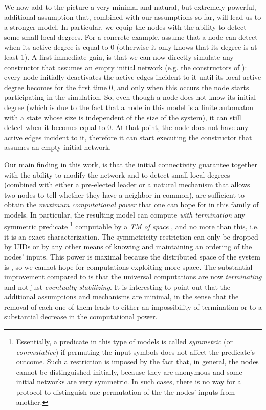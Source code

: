 \documentclass[preprint]{elsarticle}
\begin{document}
We now add to the picture a very minimal and natural, but extremely powerful, additional assumption that, combined with our assumptions so far, will lead us to a stronger model. In particular, we equip the nodes with the ability to detect some small local degrees. For a concrete example, assume that a node can detect when its active degree is equal to 0 (otherwise it only knows that its degree is at least 1). A first immediate gain, is that we can now directly simulate any constructor that assumes an empty initial network (e.g. the constructors of \cite{MS14}): every node initially deactivates the active edges incident to it until its local active degree becomes for the first time 0, and only when this occurs the node starts participating in the simulation. So, even though a node does not know its initial degree (which is due to the fact that a node in this model is a finite automaton with a state whose size is independent of the size of the system), it can still detect when it becomes equal to 0. At that point, the node does not have any active edges incident to it, therefore it can start executing the constructor that assumes an empty initial network.

Our main finding in this work, is that the initial connectivity guarantee together with the ability to modify the network and to detect small local degrees (combined with either a pre-elected leader or a natural mechanism that allows two nodes to tell whether they have a neighbor in common), are sufficient to obtain the \emph{maximum computational power} that one can hope for in this family of models. In particular, the resulting model can compute \emph{with termination} any symmetric predicate \footnote{Essentially, a predicate in this type of models is called \emph{symmetric} (or \emph{commutative}) if permuting the input symbols does not affect the predicate's outcome. Such a restriction is imposed by the fact that, in general, the nodes cannot be distinguished initially, because they are anonymous and some initial networks are very symmetric. In such cases, there is no way for a protocol to distinguish one permutation of the the nodes' inputs from another.} computable by a \emph{TM of space }, and no more than this, i.e. it is an exact characterization. The symmetricity restriction can only be dropped by UIDs or by any other means of knowing and maintaining an ordering of the nodes' inputs. This power is maximal because the distributed space of the system is , so we cannot hope for computations exploiting more space. The substantial improvement compared to \cite{MS14,MCS11-2} is that the universal computations are now \emph{terminating} and not just \emph{eventually stabilizing}. It is interesting to point out that the additional assumptions and mechanisms are minimal, in the sense that the removal of each one of them leads to either an impossibility of termination or to a substantial decrease in the computational power.
\end{document}
